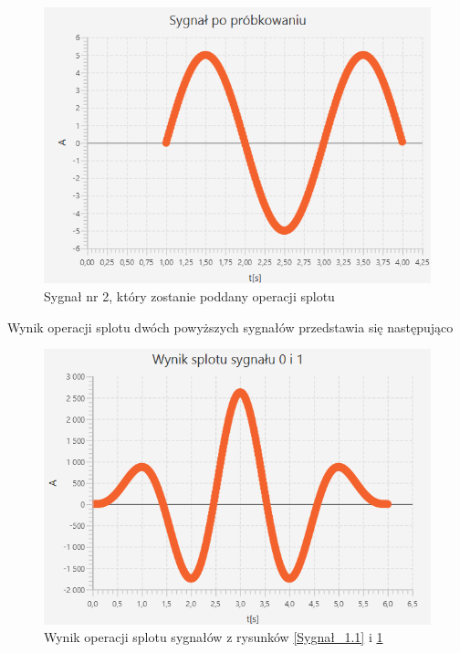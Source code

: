 \documentclass[12pt]{article}
\begin{document}
\begin{figure}[H]
    \centering
	\includegraphics[width=\linewidth]{sygnal_po_probkowaniu_1.2.png}
    \caption{Sygnał nr 2, który zostanie poddany operacji splotu}
    \label{Sygnał_1.2}
\end{figure}

Wynik operacji splotu dwóch powyższych sygnałów przedstawia się następująco
\begin{figure}[H]
    \centering
	\includegraphics[width=\linewidth]{splot_1.1.png}
    \caption{Wynik operacji splotu sygnałów z rysunków \ref{Sygnał_1.1} i \ref{Sygnał_1.2}}
    \label{Wynik_1.1}
\end{figure}
\end{document}
